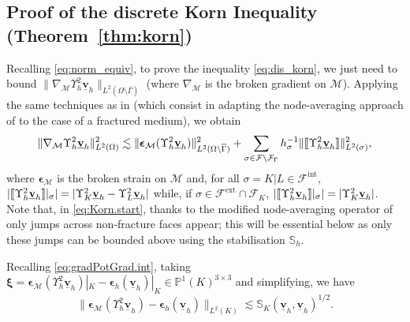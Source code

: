 \documentclass[a4paper,11pt]{article}
\theoremstyle{definition}
\theoremstyle{remark}
\newcommand{\norm}[2]{\|#2\|_{#1}}
\newcommand{\uvec}[1]{\underline{\mathbf{#1}}}
\newcommand{\bos}[1]{\boldsymbol{#1}}
\newcommand{\up}[1]{\Upsilon^2_{#1}}
\def\ext{\text{ext}}
\def\inte{\text{int}}
\def\be{\boldsymbol{\epsilon}}
\def\cF{\mathcal{F}}
\def\cM{\mathcal{M}}
\def\sjump#1{[\hskip -1.5pt[#1]\hskip -1.5pt]}
\def\O{\Omega}
\begin{document}
\subsection{Proof of the discrete Korn Inequality (Theorem~\ref{thm:korn})}\label{sec:Korn}

Recalling \eqref{eq:norm_equiv}, to prove the inequality \eqref{eq:dis_korn}, we just need to bound $\lVert\nabla_{\cM}\up{h}\uvec{v}_h\rVert_{L^2(\O\setminus\overline{\Gamma})}$ (where $\nabla_\cM$ is the broken gradient on $\cM$).
Applying the same techniques as in \cite[Theorem 5.7]{jhr} (which consist in adapting the node-averaging approach of \cite[Section 7.3.2]{hho-book}
to the case of a fractured medium), we obtain
\begin{equation}\label{eq:Korn.start}
\lVert \nabla_\cM\up{h}\uvec{v}_h\rVert^2_{L^2(\O)}\lesssim \lVert \be_\cM( \up{h}\uvec{v}_h)\rVert_{L^2(\O\setminus\overline{\Gamma})}^2+\sum_{\sigma\in\cF\setminus\cF_\Gamma}h^{-1}_\sigma\lVert \sjump{\up{h}\uvec{v}_h}\rVert_{L^2(\sigma)}^2, 
\end{equation}
where $\be_\cM$ is the broken strain on $\cM$ and, for all $\sigma=K|L\in\cF^\inte$, $|\sjump{\up{h}\uvec{v}_h}|_\sigma|=|\up{K}\uvec{v}_h-\up{L}\uvec{v}_h|$ while, if $\sigma\in\cF^\ext\cap\cF_K$, $|\sjump{\up{h}\uvec{v}_h}|_\sigma|=|\up{K}\uvec{v}_h|$. Note that, in \eqref{eq:Korn.start}, thanks to the modified node-averaging operator of \cite[Theorem 5.7]{jhr} only jumps across non-fracture faces appear; this will be essential below as only these jumps can be bounded above using the stabilisation $\mathbb S_h$.

 Recalling \eqref{eq:gradPotGrad.int}, taking $\bos{\xi}=\be_\cM(\up{h}\uvec{v}_h)|_K-\be_h(\uvec{v}_h)|_K\in \mathbb P^1(K)^{3\times 3}$ and simplifying, we have
$$
\norm{L^2(K)}{\be_\cM(\up{h}\uvec{v}_h)-\be_h(\uvec{v}_h)}\lesssim \mathbb S_K(\uvec{v}_h,\uvec{v}_h)^{1/2}.
$$
\end{document}
